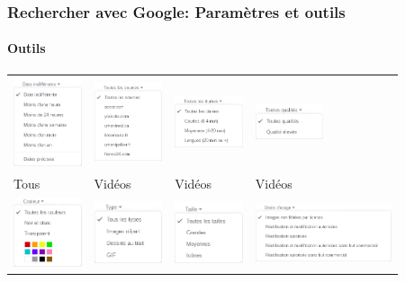 \documentclass[xcolor=table]{beamer}
\begin{document}
\begin{frame}
\frametitle{Rechercher avec Google: Paramètres et outils}
\framesubtitle{Outils}

\begin{tabular}{llll}
	
	\includegraphics[width=2cm]{..//img/Bweb02-ri-gmail/google-outils-date.png} &
	\includegraphics[width=2cm]{..//img/Bweb02-ri-gmail/google-outils-source.png} &
	\includegraphics[width=2cm]{..//img/Bweb02-ri-gmail/google-outils-duree.png} &
	\includegraphics[width=2cm]{..//img/Bweb02-ri-gmail/google-outils-qualite.png} \\
	
	Tous &
	Vidéos &
	Vidéos &
	Vidéos \\
	
	\includegraphics[width=2cm]{..//img/Bweb02-ri-gmail/google-outils-couleur.png} &
	\includegraphics[width=2cm]{..//img/Bweb02-ri-gmail/google-outils-type.png} &
	\includegraphics[width=2cm]{..//img/Bweb02-ri-gmail/google-outils-taille.png} &
	\includegraphics[width=4cm]{..//img/Bweb02-ri-gmail/google-outils-droit.png} \\
	

\end{tabular}
\end{frame}
\end{document}

